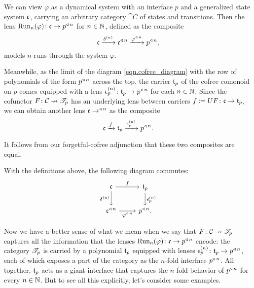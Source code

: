 \documentclass[Book-Poly]{subfiles}
\begin{document}
We can view $\varphi$ as a dynamical system with an interface $p$ and a generalized state system $\mathfrak{c}$, carrying an arbitrary category $\cat{C}$ of states and transitions.
Then the lens $\text{Run}_n(\varphi)\colon\mathfrak{c}\to p^{\mathbin{\triangleleft}\,n}$ for $n\in\mathbb{N}$, defined as the composite
\[
    \mathfrak{c}\xrightarrow{\delta^{(n)}}\mathfrak{c}^{\mathbin{\triangleleft}\,n}\xrightarrow{\varphi^{\mathbin{\triangleleft}\,n}}p^{\mathbin{\triangleleft}\,n},
\]
models $n$ runs through the system $\varphi$.

Meanwhile, as the limit of the diagram \eqref{eqn.cofree_diagram} with the row of polynomials of the form $p^{\mathbin{\triangleleft}\,n}$ across the top, the carrier $\mathfrak{t}_p$ of the cofree comonoid on $p$ comes equipped with a lens $\epsilon^{(n)}_p\colon\mathfrak{t}_p\to p^{\mathbin{\triangleleft}\,n}$ for each $n\in\mathbb{N}$.
Since the cofunctor $F\colon\mathcal{C}\nrightarrow\mathscr{T}_{p}$ has an underlying lens between carriers $f\coloneqq UF\colon\mathfrak{c}\to\mathfrak{t}_p$, we can obtain another lens $\mathfrak{c}\to^{\mathbin{\triangleleft}\,n}$ as the composite
\[
    \mathfrak{c}\xrightarrow{f}\mathfrak{t}_p\xrightarrow{\epsilon^{(n)}_p}p^{\mathbin{\triangleleft}\,n}.
\]

It follows from our forgetful-cofree adjunction that these two composites are equal.

\begin{proposition}
With the definitions above, the following diagram commutes:
\[
\begin{tikzcd}
    \car{c} \ar[r,"f"] \ar[d, "\delta^{(n)}"'] & \car{t}_p \ar[d, "\epsilon^{(n)}_p"] \\
    \car{c}\tripow{n} \ar[r, "\varphi\tripow{n}"'] & p\tripow{n}.
\end{tikzcd}
\]
\end{proposition}

Now we have a better sense of what we mean when we say that $F\colon\mathcal{C}\nrightarrow\mathscr{T}_{p}$ captures all the information that the lenses $\text{Run}_n(\varphi)\colon\mathfrak{c}\to p^{\mathbin{\triangleleft}\,n}$ encode: the category $\mathscr{T}_{p}$ is carried by a polynomial $\mathfrak{t}_p$ equipped with lenses $\epsilon^{(n)}_p\colon\mathfrak{t}_p\to p^{\mathbin{\triangleleft}\,n}$, each of which exposes a part of the category as the $n$-fold interface $p^{\mathbin{\triangleleft}\,n}$.
All together, $\mathfrak{t}_p$ acts as a giant interface that captures the $n$-fold behavior of $p^{\mathbin{\triangleleft}\,n}$ for every $n\in\mathbb{N}$.
But to see all this explicitly, let's consider some examples.
\end{document}
